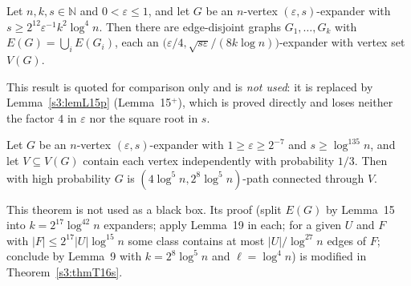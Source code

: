 \begin{citedresult}[{\cite[Lemma~15]{BM}}]\label{s1:citLem15}
Let $n,k,s\in\mathbb N$ and $0<\varepsilon\le1$, and let $G$ be an $n$-vertex
$(\varepsilon,s)$-expander with $s\ge2^{12}\varepsilon^{-1}k^2\log^4n$. Then
there are edge-disjoint graphs $G_1,\dots,G_k$ with $E(G)=\bigcup_iE(G_i)$, each
an $\bigl(\varepsilon/4,\sqrt{s\varepsilon}/(8k\log n)\bigr)$-expander with vertex
set $V(G)$.

This result is quoted for comparison only and is \emph{not used}: it is replaced
by Lemma~\ref{s3:lemL15p} (Lemma~15$^+$), which is proved directly and loses
neither the factor $4$ in $\varepsilon$ nor the square root in
$s$.
\end{citedresult}

\begin{citedresult}[{\cite[Theorem~16]{BM}}]\label{s1:citThm16}
Let $G$ be an $n$-vertex $(\varepsilon,s)$-expander with
$1\ge\varepsilon\ge2^{-7}$ and $s\ge\log^{135}n$, and let $V\subseteq V(G)$
contain each vertex independently with probability $1/3$. Then with high
probability $G$ is $(4\log^5n,2^8\log^5n)$-path connected through $V$.

This theorem is not used as a black box. Its proof (split $E(G)$ by Lemma~15
into $k=2^{17}\log^{42}n$ expanders; apply Lemma~19 in each; for a given $U$ and
$F$ with $|F|\le2^{17}|U|\log^{15}n$ some class contains at most
$|U|/\log^{27}n$ edges of $F$; conclude by Lemma~9 with $k=2^8\log^5n$ and
$\ell=\log^4n$) is modified in Theorem~\ref{s3:thmT16s}.
\end{citedresult}

